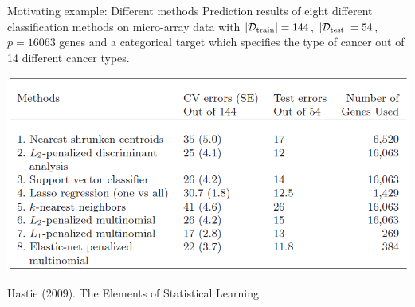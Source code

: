 \documentclass[11pt,compress,t,notes=noshow, xcolor=table]{beamer}
\begin{document}

  \begin{vbframe}{Motivating example: Different methods}
  Prediction results of eight different classification methods on micro-array data with $| \mathcal{D}_{\text{train}} | = 144$, $| \mathcal{D}_{\text{test}} | = 54$, $p=16 063$ genes and a categorical target which specifies the type of cancer out of 14 different cancer types.

  \begin{center}
  \includegraphics{figure_man/tibshirani_tab_18_1.png}

  \footnotesize{Hastie (2009). The Elements of Statistical Learning}
  \end{center}
  \end{vbframe}
\end{document}
